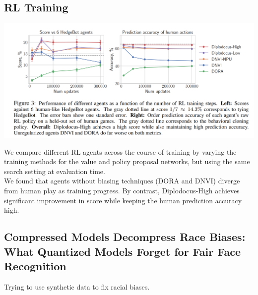 \documentclass[12pt]{article}
\begin{document}
\subsection{RL Training}
\begin{center}
  \includegraphics*[scale = 0.7]{table24.png}
\end{center}
We compare different RL agents across the course of training by varying the training methods for the value and policy proposal networks, but using the same search
setting at evaluation time.\\
We found that agents without biasing techniques (DORA and DNVI) diverge from human
play as training progress. By contrast, Diplodocus-High achieves significant improvement in score while keeping the human prediction accuracy high.
\subsection{Compressed Models Decompress Race Biases: What
Quantized Models Forget for Fair Face Recognition}
Trying to use synthetic data to fix racial biases.
\end{document}

